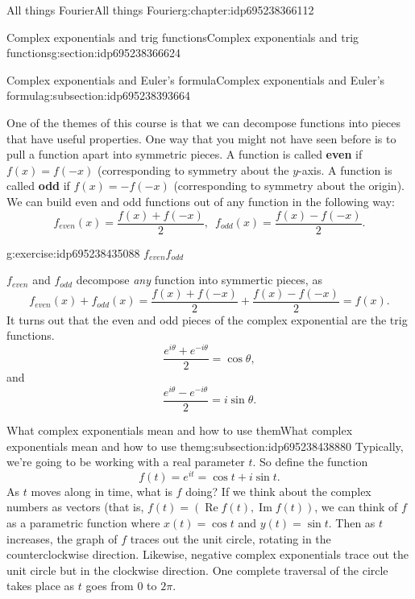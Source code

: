 \documentclass[oneside,10pt,]{book}
\newcommand{\terminology}[1]{\textbf{#1}}
\numberwithin{equation}{section}
\DeclareMathOperator{\RE}{Re}
\DeclareMathOperator{\IM}{Im}
\numberwithin{equation}{section}
\begin{document}
\begin{chapterptx}{All things Fourier}{}{All things Fourier}{}{}{g:chapter:idp695238366112}
\begin{sectionptx}{Complex exponentials and trig functions}{}{Complex exponentials and trig functions}{}{}{g:section:idp695238366624}
\begin{subsectionptx}{Complex exponentials and Euler's formula}{}{Complex exponentials and Euler's formula}{}{}{g:subsection:idp695238393664}
\begin{equation*}
\end{equation*}
%
\par
One of the themes of this course is that we can decompose functions into pieces that have useful properties. One way that you might not have seen before is to pull a function apart into symmetric pieces. A function is called \terminology{even} if \(f(x) = f(-x)\) (corresponding to symmetry about the \(y\)-axis. A function is called \terminology{odd} if \(f(x) = -f(-x)\) (corresponding to symmetry about the origin). We can build even and odd functions out of any function in the following way:%
\begin{equation*}
f_{even}(x) = \frac{f(x) + f(-x)}{2}, \,\,\, f_{odd}(x) = \frac{f(x) - f(-x)}{2}.
\end{equation*}
%
\begin{inlineexercise}{}{g:exercise:idp695238435088}%
\(f_{even}\)\(f_{odd}\)\end{inlineexercise}%
\(f_{even}\) and \(f_{odd}\) decompose \emph{any} function into symmertic pieces, as%
\begin{equation*}
f_{even}(x) + f_{odd}(x) = \frac{f(x) + f(-x)}{2} + \frac{f(x) - f(-x)}{2} = f(x).
\end{equation*}
It turns out that the even and odd pieces of the complex exponential are the trig functions.%
\begin{equation*}
\frac{e^{i\theta} + e^{-i\theta}}{2} = \cos \theta,
\end{equation*}
and%
\begin{equation*}
\frac{e^{i\theta} - e^{-i\theta}}{2} = i \sin \theta.
\end{equation*}
%
\end{subsectionptx}
%
%
\typeout{************************************************}
\typeout{************************************************}
%
\begin{subsectionptx}{What complex exponentials mean and how to use them}{}{What complex exponentials mean and how to use them}{}{}{g:subsection:idp695238438880}
Typically, we're going to be working with a real parameter \(t\). So define the function%
\begin{equation*}
f(t) = e^{it} = \cos t + i \sin t.
\end{equation*}
As \(t\) moves along in time, what is \(f\) doing? If we think about the complex numbers as vectors (that is, \(f(t) = (\RE f(t), \IM f(t))\), we can think of \(f\) as a parametric function where \(x(t) = \cos t\) and \(y(t) = \sin t\). Then as \(t\) increases, the graph of \(f\) traces out the unit circle, rotating in the counterclockwise direction. Likewise, negative complex exponentials trace out the unit circle but in the clockwise direction. One complete traversal of the circle takes place as \(t\) goes from \(0\) to \(2 \pi\).%

\end{subsectionptx}
\end{sectionptx}
\end{chapterptx}
\end{document}
